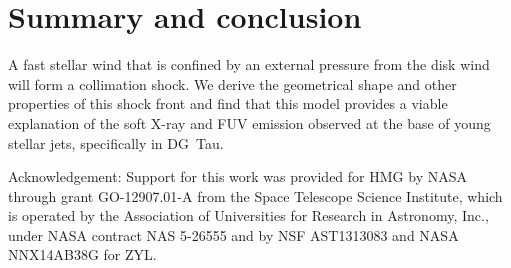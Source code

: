 \section{Summary and conclusion}
\label{sect:summary}
A fast stellar wind that is confined by an external pressure from the disk wind will form a collimation shock. We derive the geometrical shape and other properties of this shock front and find that this model provides a viable explanation of the soft X-ray and FUV emission observed at the base of young stellar jets, specifically in DG~Tau.

Acknowledgement: Support for this work was provided for HMG by NASA through grant GO-12907.01-A from the Space Telescope Science Institute, which is operated by the Association of Universities for Research in Astronomy, Inc., under NASA contract NAS 5-26555 and by NSF AST1313083 and NASA NNX14AB38G for ZYL.